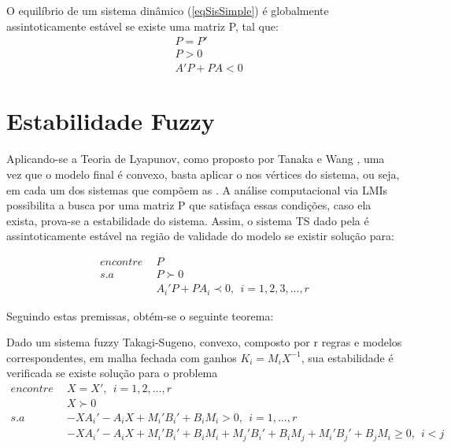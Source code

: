 \begin{myteo} \label{teoremaLyapP}
	O equilíbrio de um sistema dinâmico (\ref{eqSisSimple}) é globalmente assintoticamente estável se existe uma matriz P, tal que:
	\begin{align*}
		&P=P'  \\
		&P > 0 \\
		&A'P + P A < 0
	\end{align*}
\end{myteo}

\section{Estabilidade Fuzzy}
Aplicando-se a Teoria de Lyapunov, como proposto por Tanaka e Wang \cite{wang}, uma vez que o modelo final é convexo, basta aplicar o  nos vértices do sistema, ou seja, em cada um dos sistemas que compõem as . 
A análise computacional via LMIs possibilita a busca por uma matriz P que satisfaça essas condições, caso ela exista, prova-se a estabilidade do sistema. Assim, o sistema TS dado pela  é assintoticamente estável na região de validade do modelo \cite{tanakaWang} se existir solução para:

\begin{align} \label{eqLyapXk}
	encontre \ \ &P \nonumber \\
	s.a \ \ &P \succ 0 \nonumber \\
	&A_i'P + P A_i \prec 0, \ \ i=1,2,3, ... , r
\end{align}

Seguindo estas premissas, obtém-se o seguinte teorema:
\begin{myteo} \label{teoControlador}
Dado um sistema fuzzy Takagi-Sugeno, convexo, composto por r regras e modelos correspondentes, em malha fechada com ganhos $K_i = M_i X^{-1}$, sua estabilidade é verificada \cite{wang} se existe solução para o problema
	\begin{align} \label{eqContFuzzy}
		encontre \ \ &X = X', \ \ i = 1,2,...,r \nonumber \\
		&X \succ 0 \nonumber \\
		s.a \ \ &-XA_i'-A_iX + M_i'B_i' + B_iM_i > 0, \ \ i=1,...,r \nonumber \\
		&-XA_i'-A_iX + M_i'B_i' + B_iM_i + M_j'B_i' + B_iM_j + M_i'B_j' + B_jM_i \geq 0, \ \  i<j
	\end{align}
\end{myteo}

%

